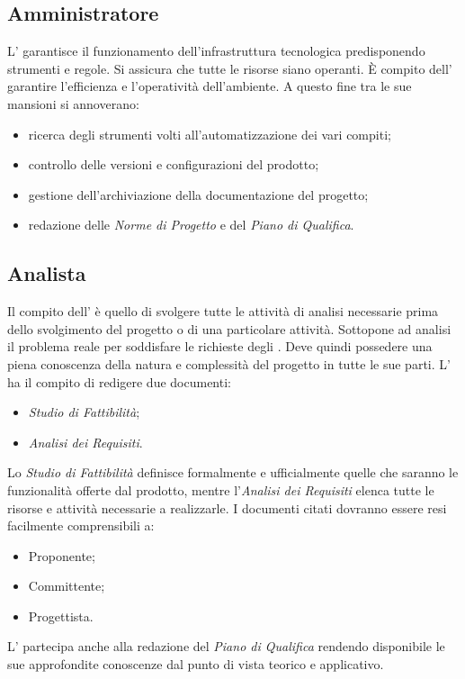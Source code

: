 \subsection{Amministratore}
L'\Amministratore{} garantisce il funzionamento dell'infrastruttura tecnologica predisponendo strumenti e regole. Si assicura che tutte le risorse siano operanti. \`{E} compito dell'\Amministratore{} garantire l'efficienza e l'operatività dell'ambiente. A questo fine tra le sue mansioni si annoverano:
\begin{itemize}
	\item ricerca degli strumenti volti all'automatizzazione dei vari compiti;
	\item controllo delle versioni e configurazioni del prodotto;
	\item gestione dell'archiviazione della documentazione del progetto;
	\item redazione delle \textit{Norme di Progetto} e del \textit{Piano di Qualifica}.
\end{itemize}

\subsection{Analista}
Il compito dell'\Analista{} è quello di svolgere tutte le attività di analisi necessarie prima dello svolgimento del progetto o di una particolare attività. Sottopone ad analisi il problema reale per soddisfare le richieste degli . Deve quindi possedere una piena conoscenza della natura e complessità del progetto in tutte le sue parti. L'\Analista{} ha il compito di redigere due documenti:
\begin{itemize}
	\item \textit{Studio di Fattibilità};
	\item \textit{Analisi dei Requisiti}.
\end{itemize}
Lo \textit{Studio di Fattibilità} definisce formalmente e ufficialmente quelle che saranno le funzionalità offerte dal prodotto, mentre l'\textit{Analisi dei Requisiti} elenca tutte le risorse e attività necessarie a realizzarle. I documenti citati dovranno essere resi facilmente comprensibili a:
\begin{itemize}
	\item Proponente;
	\item Committente;
	\item Progettista.
\end{itemize}
L'\Analista{} partecipa anche alla redazione del \textit{Piano di Qualifica} rendendo disponibile le sue approfondite conoscenze dal punto di vista teorico e applicativo.


